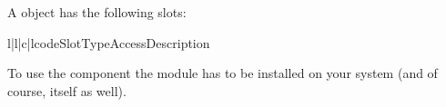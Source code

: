 A  object has the following slots:

\begin{tableiv}{l|l|c|l}{code}{Slot}{Type}{Access}{Description}
\end{tableiv}

\begin{notice}[note]
To use the  component the
 module has to be 
installed on your system (and of course, 
 itself as well).
\end{notice}

